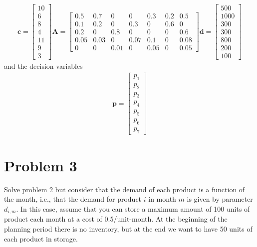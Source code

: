 \documentclass[11pt]{article}
\begin{document}
\begin{align*}
  \textbf{c} = 
    \begin{bmatrix}
       10 \\ 6 \\ 8 \\ 4 \\ 11 \\ 9 \\ 3
    \end{bmatrix}
  \textbf{A} = 
    \begin{bmatrix}
       0.5 & 0.7 & 0 & 0 & 0.3 & 0.2 & 0.5 \\
       0.1 & 0.2 & 0 & 0.3 & 0 & 0.6 & 0 \\
       0.2 & 0 & 0.8 & 0 & 0 & 0 & 0.6 \\
       0.05 & 0.03 & 0 & 0.07 & 0.1 & 0 & 0.08 \\
       0 & 0 & 0.01 & 0 & 0.05 & 0 & 0.05
    \end{bmatrix}
  \textbf{d} = 
    \begin{bmatrix}
       500 \\ 1000 \\ 300 \\ 300 \\ 800 \\ 200 \\ 100
    \end{bmatrix}
\end{align*}
and the decision variables
\begin{align*}
  \textbf{p} = 
  \begin{bmatrix}
     p_1 \\ p_2 \\ p_3 \\ p_4 \\ p_5 \\ p_6 \\ p_7
  \end{bmatrix}
\end{align*}

\section{Problem 3}
Solve problem 2 but consider that the demand of each product is a function of
the month, i.e., that the demand for product $i$ in month $m$ is given by parameter $d_{i,m}$. In this
case, assume that you can store a maximum amount of 100 units of product each month at
a cost of 0.5/unit-month. At the beginning of the planning period there is no inventory, but at
the end we want to have 50 units of each product in storage.
\end{document}
